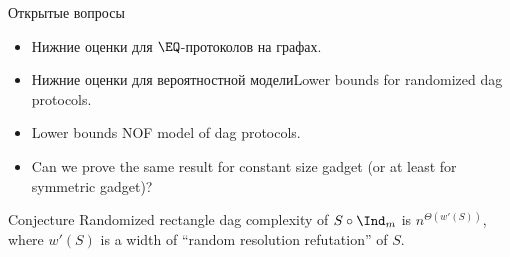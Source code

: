 \begin{frame}{Открытые вопросы}

    \begin{itemize}
        \item Нижние оценки для $\EQ$-протоколов на графах.
        \item Нижние оценки для вероятностной моделиLower bounds for randomized dag protocols.
        \item Lower bounds NOF model of dag protocols.
        \item Can we prove the same result for constant size gadget (or at least for symmetric gadget)?
    \end{itemize}

    \pause
    \begin{block}{Conjecture}
        Randomized rectangle dag complexity of $S \circ \Ind_{m}$ is $n^{\Theta(w'(S))}$, where $w'(S)$
        is a width of ``random resolution refutation'' of $S$.
    \end{block}
\end{frame}